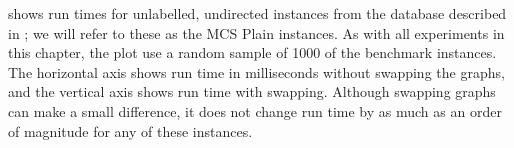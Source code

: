  shows run times for unlabelled,
undirected instances from the database described in
; we will refer to these as the MCS Plain
instances.  As with all experiments in this chapter, the plot use a
random sample of 1000 of the benchmark instances.  The horizontal axis shows
run time in milliseconds without swapping the graphs, and the vertical axis
shows run time with swapping.  Although swapping graphs can make a small
difference, it does not change run time by as much as an order of magnitude for
any of these instances.

\begin{figure}[htb]
    \centering
\end{figure}

